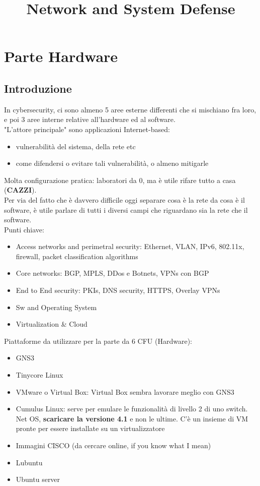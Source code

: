\documentclass[12pt, oneside]{extbook} %
\title{Network and System Defense}
\begin{document}
\maketitle
\tableofcontents
\newpage
\part{Parte Hardware}
\chapter{Introduzione}
In cybersecurity, ci sono almeno 5 aree esterne differenti che si mischiano fra loro, e poi 3 aree interne relative all'hardware ed al software.\\ "L'attore principale" sono applicazioni Internet-based:
\begin{itemize}
\item vulnerabilità del sistema, della rete etc
\item come difendersi o evitare tali vulnerabilità, o almeno mitigarle
\end{itemize}
Molta configurazione pratica: laboratori da 0, ma è utile rifare tutto a casa (\textbf{CAZZI}).\\ Per via del fatto che è davvero difficile oggi separare cosa è la rete da cosa è il software, è utile parlare di tutti i diversi campi che riguardano sia la rete che il software.\\ Punti chiave:
\begin{itemize}
\item Access networks and perimetral security: Ethernet, VLAN, IPv6, 802.11x, firewall, packet classification algorithms
\item Core networks: BGP, MPLS, DDos e Botnets, VPNs con BGP
\item End to End security: PKIs, DNS security, HTTPS, Overlay VPNs
\item Sw and Operating System
\item Virtualization \& Cloud 
\end{itemize}
Piattaforme da utilizzare per la parte da 6 CFU (Hardware):
\begin{itemize}
\item GNS3
\item Tinycore Linux
\item VMware o Virtual Box: Virtual Box sembra lavorare meglio con GNS3
\item Cumulus Linux: serve per emulare le funzionalità di livello 2 di uno switch. Net OS, \textbf{scaricare la versione 4.1} e non le ultime. C'è un insieme di VM pronte per essere installate su un virtualizzatore
\item Immagini CISCO (da cercare online, if you know what I mean)
\item Lubuntu
\item Ubuntu server
\end{itemize}
\end{document}
